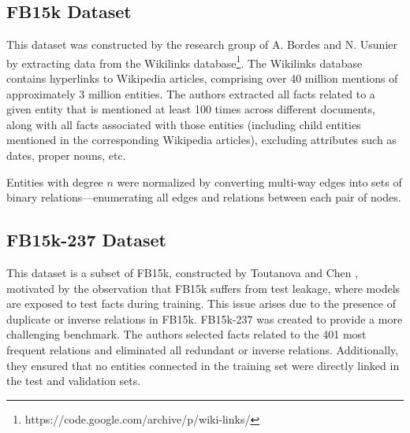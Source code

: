 \subsection{FB15k Dataset}

This dataset was constructed by the research group of A. Bordes and N. Usunier \cite{bordes2013translating} by extracting data from the Wikilinks database\footnote{https://code.google.com/archive/p/wiki-links/}. The Wikilinks database contains hyperlinks to Wikipedia articles, comprising over 40 million mentions of approximately 3 million entities. The authors extracted all facts related to a given entity that is mentioned at least 100 times across different documents, along with all facts associated with those entities (including child entities mentioned in the corresponding Wikipedia articles), excluding attributes such as dates, proper nouns, etc. 

Entities with degree \(n\) were normalized by converting multi-way edges into sets of binary relations—enumerating all edges and relations between each pair of nodes.


\subsection{FB15k-237 Dataset}

This dataset is a subset of FB15k, constructed by Toutanova and Chen \cite{toutanova2015observed}, motivated by the observation that FB15k suffers from test leakage, where models are exposed to test facts during training. This issue arises due to the presence of duplicate or inverse relations in FB15k. FB15k-237 was created to provide a more challenging benchmark. The authors selected facts related to the 401 most frequent relations and eliminated all redundant or inverse relations. Additionally, they ensured that no entities connected in the training set were directly linked in the test and validation sets.




